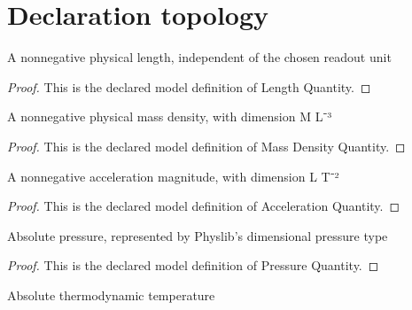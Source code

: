 \section{Declaration topology}
\begin{definition}
  \label{def:physics:phyx-mini-0382:phyxminiproblems-problemphyxmini0382-lengthquantity}
  A nonnegative physical length, independent of the chosen readout unit
\end{definition}
\begin{proof}
  This is the declared model definition of Length Quantity.
\end{proof}
\begin{definition}
  \label{def:physics:phyx-mini-0382:phyxminiproblems-problemphyxmini0382-massdensityquantity}
  A nonnegative physical mass density, with dimension M L⁻³
\end{definition}
\begin{proof}
  This is the declared model definition of Mass Density Quantity.
\end{proof}
\begin{definition}
  \label{def:physics:phyx-mini-0382:phyxminiproblems-problemphyxmini0382-accelerationquantity}
  A nonnegative acceleration magnitude, with dimension L T⁻²
\end{definition}
\begin{proof}
  This is the declared model definition of Acceleration Quantity.
\end{proof}
\begin{definition}
  \label{def:physics:phyx-mini-0382:phyxminiproblems-problemphyxmini0382-pressurequantity}
  Absolute pressure, represented by Physlib's dimensional pressure type
\end{definition}
\begin{proof}
  This is the declared model definition of Pressure Quantity.
\end{proof}
\begin{definition}
  \label{def:physics:phyx-mini-0382:phyxminiproblems-problemphyxmini0382-temperaturequantity}
  Absolute thermodynamic temperature
\end{definition}
